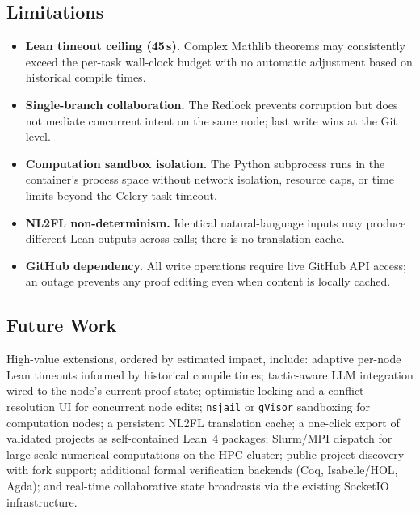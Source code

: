 \documentclass[conference]{IEEEtran}
\begin{document}
\subsection{Limitations}
\label{subsec:disc-limits}

\begin{itemize}
  \item \textbf{Lean timeout ceiling (45\,s).} Complex Mathlib theorems may
    consistently exceed the per-task wall-clock budget with no automatic
    adjustment based on historical compile times.
  \item \textbf{Single-branch collaboration.} The Redlock prevents
    corruption but does not mediate concurrent intent on the same node;
    last write wins at the Git level.
  \item \textbf{Computation sandbox isolation.} The Python subprocess runs
    in the container's process space without network isolation, resource
    caps, or time limits beyond the Celery task timeout.
  \item \textbf{NL2FL non-determinism.} Identical natural-language inputs
    may produce different Lean outputs across calls; there is no
    translation cache.
  \item \textbf{GitHub dependency.} All write operations require live
    GitHub API access; an outage prevents any proof editing even when
    content is locally cached.
\end{itemize}

\subsection{Future Work}
\label{subsec:future}

High-value extensions, ordered by estimated impact, include: adaptive
per-node Lean timeouts informed by historical compile times; tactic-aware
LLM integration wired to the node's current proof state; optimistic locking
and a conflict-resolution UI for concurrent node edits; \texttt{nsjail} or
\texttt{gVisor} sandboxing for computation nodes; a persistent NL2FL
translation cache; a one-click export of validated projects as
self-contained Lean~4 packages; Slurm/MPI dispatch for large-scale numerical
computations on the HPC cluster; public project discovery with fork support;
additional formal verification backends (Coq, Isabelle/HOL, Agda); and
real-time collaborative state broadcasts via the existing SocketIO
infrastructure.

\end{document}
